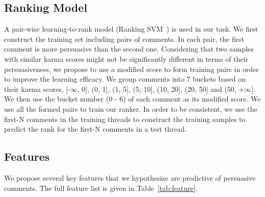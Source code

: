 \documentclass[11pt]{article}
\begin{document}
\subsection{Ranking Model}

A pair-wise learning-to-rank model (Ranking SVM~\cite{joachims2002optimizing}) is used in our task. We first construct the training set including pairs of comments. In each pair, the first comment is more persuasive than the second one. Considering that two samples with similar karma scores might not be significantly different in terms of their persuasiveness, we propose to use a modified score to form training pairs in order to improve the learning efficacy. We group comments into 7 buckets based on their karma scores,  [-$\infty$, 0], (0, 1], (1, 5], (5, 10], (10, 20], (20, 50] and (50, +$\infty$]. We then use the bucket number (0 - 6) of each comment as its modified score. We use all the formed pairs to train our ranker. In order to be consistent, we use the first-N comments in the training threads to construct the training samples to predict the rank for the first-N comments in a test thread. 



\subsection{Features}
\label{sec:features}

We propose several key features that we hypothesize are predictive of persuasive comments. The full feature list is given in Table~\ref{tab:feature}. 

\end{document}
